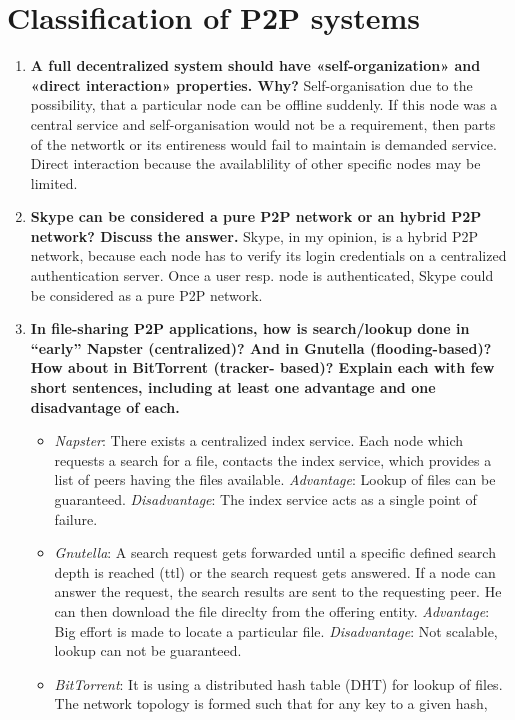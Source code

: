 \documentclass{article}
\begin{document}
\section{Classification of P2P systems}
  \begin{enumerate}[1]
    \item \textbf{A full decentralized system should have «self-organization» and «direct interaction» properties. Why?}
          Self-organisation due to the possibility, that a particular node can be offline suddenly. If this node was a central service 
          and self-organisation would not be a requirement, then parts of the networtk or its entireness would fail to maintain is demanded service.
          Direct interaction because the availablility of other specific nodes may be limited. 
    \item \textbf{Skype can be considered a pure P2P network or an hybrid P2P network? Discuss the answer.}
          Skype, in my opinion, is a hybrid P2P network, because each node has to verify its login credentials on a centralized authentication server. 
          Once a user resp. node is authenticated, Skype could be considered as a pure P2P network.
    \item \textbf{In file-sharing P2P applications, how is search/lookup done in “early” Napster (centralized)? And in Gnutella (flooding-based)? How about in BitTorrent (tracker- based)? Explain each with few short sentences, including at least one advantage and one disadvantage of each.}
          \begin{itemize}
            \item \textit{Napster}: There exists a centralized index service. Each node which requests a search for a file, contacts the 
                  index service, which provides a list of peers having the files available. 
                  \textit{Advantage}: Lookup of files can be guaranteed. 
                  \textit{Disadvantage}: The index service acts as a single point of failure.
            \item \textit{Gnutella}: A search request gets forwarded until a specific defined search depth is reached (ttl) or the search request gets answered.
                  If a node can answer the request, the search results are sent to the requesting peer. He can then download the file direclty from the offering entity.
                  \textit{Advantage}: Big effort is made to locate a particular file.
                  \textit{Disadvantage}: Not scalable, lookup can not be guaranteed.
            \item \textit{BitTorrent}: It is using a distributed hash table (DHT) for lookup of files. The network topology is formed such that for any key to a given hash, 

\end{itemize}
\end{enumerate}
\end{document}
